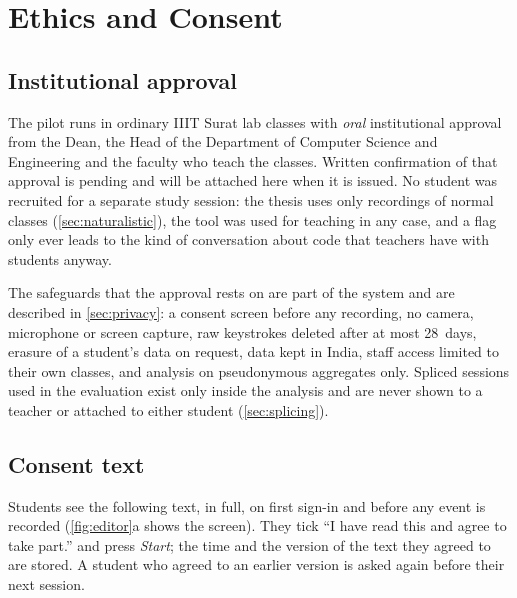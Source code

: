 \chapter{Ethics and Consent}
\label{app:ethics}

\section{Institutional approval}
\label{app:approval}
The pilot runs in ordinary IIIT Surat lab classes with \emph{oral} institutional
approval from the Dean, the Head of the Department of Computer Science and
Engineering and the faculty who teach the classes. Written confirmation of that
approval is pending and will be attached here when it is issued. No student was
recruited for a separate study session: the thesis uses only recordings of
normal classes (\cref{sec:naturalistic}), the tool was used for teaching in
any case, and a flag only ever leads to the kind of conversation about code that
teachers have with students anyway.

The safeguards that the approval rests on are part of the system and are
described in \cref{sec:privacy}: a consent screen before any recording, no
camera, microphone or screen capture, raw keystrokes deleted after at most
28~days, erasure of a student's data on request, data kept in India, staff
access limited to their own classes, and analysis on pseudonymous aggregates
only. Spliced sessions used in the evaluation exist only inside the analysis and
are never shown to a teacher or attached to either student
(\cref{sec:splicing}).

\section{Consent text}
\label{app:consent}
Students see the following text, in full, on first sign-in and before any
event is recorded (\cref{fig:editor}a shows the screen). They tick ``I have read
this and agree to take part.'' and press \emph{Start}; the time and the version
of the text they agreed to are stored. A student who agreed to an earlier
version is asked again before their next session.

